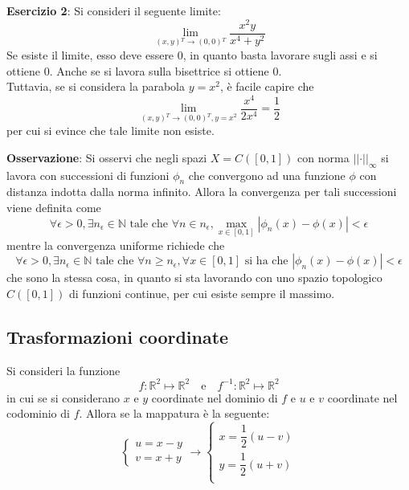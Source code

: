 \documentclass[a4paper]{extarticle}
\begin{document}
\vspace{1em}
\noindent
\textbf{Esercizio 2}: Si consideri il seguente limite:
\[\lim_{(x,y){^T} \to (0,0){^T}} \frac{x^2y}{x^4+y^2}\]
Se esiste il limite, esso deve essere $0$, in quanto basta lavorare sugli assi e si ottiene $0$. Anche se si lavora sulla bisettrice si ottiene $0$.\\
Tuttavia, se si considera la parabola $y=x^2$, è facile capire che
\[\lim_{(x,y){^T} \to (0,0){^T},y=x^2} \frac{x^4}{2x^4}=\frac{1}{2}\]
per cui si evince che tale limite non esiste.

\vspace{1em}
\noindent
\textbf{Osservazione}: Si osservi che negli spazi $X=C([0,1])$ con norma $\vert \vert \cdot \vert \vert_\infty$ si lavora con successioni di funzioni $\phi_n$ che convergono ad una funzione $\phi$ con distanza indotta dalla norma infinito. Allora la convergenza per tali successioni viene definita come
\[\forall \epsilon > 0, \exists n_\epsilon \in \mathbb{N} \text{ tale che } \forall n \in n_\epsilon, \underset{x \in [0,1]}{\max} \left \vert \phi_n(x) - \phi(x) \right \vert < \epsilon\]
mentre la convergenza uniforme richiede che
\[\forall \epsilon > 0, \exists n_\epsilon \in \mathbb{N} \text{ tale che } \forall n \geq n_\epsilon, \forall x \in [0,1] \text{ si ha che } \left \vert \phi_n(x) - \phi(x) \right \vert < \epsilon\]
che sono la stessa cosa, in quanto si sta lavorando con uno spazio topologico $C([0,1])$ di funzioni continue, per cui esiste sempre il massimo.

\vspace{1em}
\noindent
\subsection{Trasformazioni coordinate}
Si consideri la funzione
\[f : \mathbb{R}^2 \longmapsto \mathbb{R}^2 \hspace{1em} \text{e} \hspace{1em} f^{-1} : \mathbb{R}^2 \longmapsto \mathbb{R}^2\]
in cui se si considerano $x$ e $y$ coordinate nel dominio di $f$ e $u$ e $v$ coordinate nel codominio di $f$. Allora se la mappatura è la seguente:
\[
    \left\{
    \begin{array}{l}
        u=x-y\\
        v=x+y
    \end{array}  
    \right.
    \rightarrow
    \left\{
    \begin{array}{l}
        x=\dfrac{1}{2} (u-v)\\
        y=\dfrac{1}{2} (u+v)\\
    \end{array}  
    \right.
\]
\end{document}
